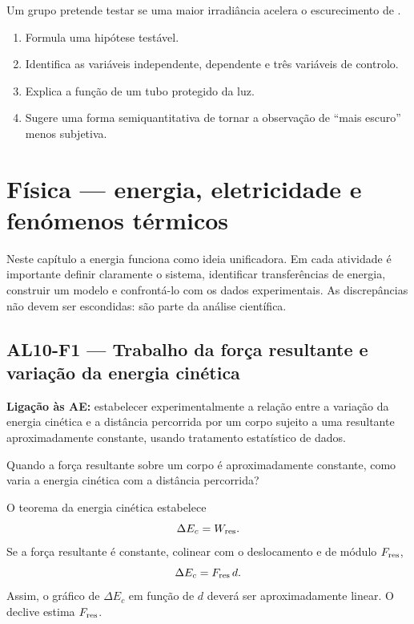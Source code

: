 \documentclass[11pt,a4paper,openany]{book}
\newcounter{exercicio}[chapter]
\renewcommand{\theexercicio}{\thechapter.\arabic{exercicio}}
\newenvironment{exercicio}[1][]%
{\refstepcounter{exercicio}%
\begin{tcolorbox}[breakable,colback=white,colframe=eublue!70,
 title={Exercício \theexercicio\if\relax\detokenize{#1}\relax\else\ --- #1\fi},fonttitle=\bfseries]}%
{\end{tcolorbox}}
\newcommand{\LigAE}[1]{\textbf{Ligação às AE:} #1}
\begin{document}
\begin{exercicio}[Desenho experimental]
Um grupo pretende testar se uma maior irradiância acelera o escurecimento de .
\begin{enumerate}[label=\alph*)]
\item Formula uma hipótese testável.
\item Identifica as variáveis independente, dependente e três variáveis de controlo.
\item Explica a função de um tubo protegido da luz.
\item Sugere uma forma semiquantitativa de tornar a observação de ``mais escuro'' menos subjetiva.
\end{enumerate}
\end{exercicio}

\chapter{Física — energia, eletricidade e fenómenos térmicos}

\begin{essencial}
Neste capítulo a energia funciona como ideia unificadora. Em cada atividade é importante definir claramente o sistema, identificar transferências de energia, construir um modelo e confrontá-lo com os dados experimentais. As discrepâncias não devem ser escondidas: são parte da análise científica.
\end{essencial}

\section{AL10-F1 — Trabalho da força resultante e variação da energia cinética}
\LigAE{estabelecer experimentalmente a relação entre a variação da energia cinética e a distância percorrida por um corpo sujeito a uma resultante aproximadamente constante, usando tratamento estatístico de dados.}

\begin{questao}
Quando a força resultante sobre um corpo é aproximadamente constante, como varia a energia cinética com a distância percorrida?
\end{questao}

\begin{fundamento}
O teorema da energia cinética estabelece
\[
\Delta E_c=W_{\rm res}.
\]
Se a força resultante é constante, colinear com o deslocamento e de módulo $F_{\rm res}$,
\[
\Delta E_c=F_{\rm res}\,d.
\]
Assim, o gráfico de $\Delta E_c$ em função de $d$ deverá ser aproximadamente linear. O declive estima $F_{\rm res}$.
\end{fundamento}
\end{document}
